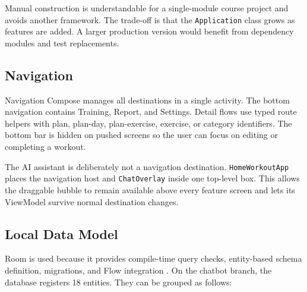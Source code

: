 Manual construction is understandable for a single-module course project and avoids another framework. The trade-off is that the \texttt{Application} class grows as features are added. A larger production version would benefit from dependency modules and test replacements.

\subsection{Navigation}

Navigation Compose manages all destinations in a single activity. The bottom navigation contains Training, Report, and Settings. Detail flows use typed route helpers with plan, plan-day, plan-exercise, exercise, or category identifiers. The bottom bar is hidden on pushed screens so the user can focus on editing or completing a workout.

The AI assistant is deliberately not a navigation destination. \texttt{HomeWorkoutApp} places the navigation host and \texttt{ChatOverlay} inside one top-level box. This allows the draggable bubble to remain available above every feature screen and lets its ViewModel survive normal destination changes.

\subsection{Local Data Model}

Room is used because it provides compile-time query checks, entity-based schema definition, migrations, and Flow integration \cite{room}. On the chatbot branch, the database registers 18 entities. They can be grouped as follows:

